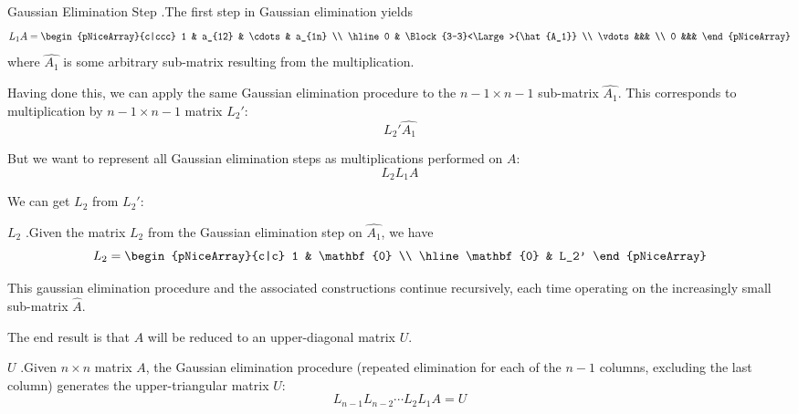 \documentclass[12pt,letterpaper]{article}
\begin{document}
\begin{theo}{Gaussian Elimination Step}
.The first step in Gaussian elimination yields
\begin{equation}
L_1 A = \begin{pNiceArray}{c|ccc}
	1 & a_{12} & \cdots & a_{1n} \\
	\hline
	0 & \Block{3-3}<\Large>{\hat{A_1}} \\
	\vdots &&& \\
	0 &&&
\end{pNiceArray}
\end{equation}
where $\hat{A_1}$ is some arbitrary sub-matrix resulting from the multiplication.
\label{thm:Gauss_step_1}
\end{theo}

Having done this, we can apply the same Gaussian elimination procedure to the $n-1 \times n-1$ sub-matrix $\hat{A_1}$. This corresponds to multiplication by $n-1 \times n-1$ matrix $L_2'$:
\begin{equation}
	L_2' \hat{A_1}
\end{equation}

But we want to represent all Gaussian elimination steps as multiplications performed on $A$:
\begin{equation}
	L_2 L_1 A
\end{equation}

We can get $L_2$ from $L_2'$:
\begin{constr}{$L_2$}
.Given the matrix $L_2$ from the Gaussian elimination step on $\hat{A_1}$, we have
\begin{equation}
L_2 = \begin{pNiceArray}{c|c}
	1 & \mathbf{0} \\
	\hline
	\mathbf{0} & L_2'
\end{pNiceArray}
\end{equation}
\end{constr}

This gaussian elimination procedure and the associated constructions continue recursively, each time operating on the increasingly small sub-matrix $\hat{A}$.

The end result is that $A$ will be reduced to an upper-diagonal matrix $U$.

\begin{defn}{$U$}
.Given $n\times n$ matrix $A$, the Gaussian elimination procedure (repeated elimination for each of the $n-1$ columns, excluding the last column) generates the upper-triangular matrix $U$:
\begin{equation}
	L_{n-1} L_{n-2} \cdots L_2 L_1A = U
\end{equation}
\label{defn:U}
\end{defn}
\end{document}
